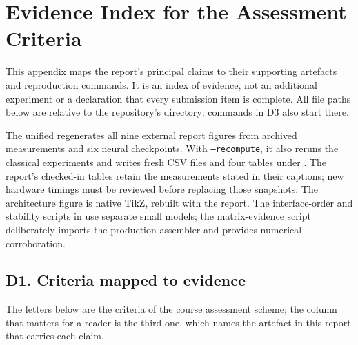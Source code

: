 \section{Evidence Index for the Assessment Criteria}
\label{app:evidence}

This appendix maps the report's principal claims to their supporting
artefacts and reproduction commands. It is an index of evidence, not an
additional experiment or a declaration that every submission item is complete.
All file paths below are relative to the repository's 
directory; commands in D3 also start there.

The unified  regenerates all nine external report
figures from archived measurements and six neural checkpoints. With
\texttt{--recompute}, it also reruns the classical experiments and writes
fresh CSV files and four tables under . The report's
checked-in tables retain the measurements stated in their captions; new
hardware timings must be reviewed before replacing those snapshots.
The architecture figure is native TikZ, rebuilt with the report.
The interface-order and stability scripts in 
use separate small models; the matrix-evidence script deliberately imports
the production assembler and provides numerical corroboration.

\subsection*{D1. Criteria mapped to evidence}

The letters below are the criteria of the course assessment scheme; the column
that matters for a reader is the third one, which names the artefact in this
report that carries each claim.

